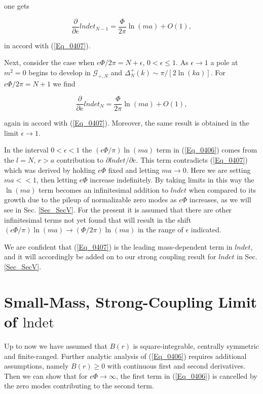 \documentclass[a4paper,twocolumn,showpacs,preprintnumbers,amsmath,amssymb]{revtex4}
\newcommand{\pdo}[1]{\ensuremath{\frac{\partial }
        {\partial #1 }}}
\begin{document}
\noindent
one gets

\begin{equation}
\label{Eq_0410}
\pdo{e} lndet_{N-1} = \frac{\Phi}{2\pi} \ln(ma) + O(1),
\end{equation}

\noindent
in accord with (\ref{Eq_0407}).

Next, consider the case when $e\Phi/2\pi = N + \epsilon$,
$0 < \epsilon \leq 1$. As $\epsilon \to 1$ a pole at $m^2 = 0$ begins
to develop in $\mathcal{G}_{+,N}$ and
$\Delta^{+}_N(k) \sim \pi / [2\ln(ka)]$. For $e\Phi/2\pi = N+1$ we
find

\begin{equation}
\label{Eq_0411}
\pdo{e} lndet_N = \frac{\Phi}{2\pi}\ln(ma) + O(1),
\end{equation}

\noindent
again in accord with (\ref{Eq_0407}). Moreover, the same result is
obtained in the limit $\epsilon \to 1$.

In the interval $0 < \epsilon < 1$ the $(\epsilon\Phi/\pi)\ln(ma)$
term in (\ref{Eq_0406}) comes from the $l=N$, $r > a$ contribution to
$\partial lndet / \partial e$. This term contradicts (\ref{Eq_0407})
which was derived by holding $e\Phi$ fixed and letting $ma \to
0$. Here we are setting $ma << 1$, then letting $e\Phi$ increase
indefinitely. By taking limits in this way the $\ln(ma)$ term becomes
an infinitesimal addition to $lndet$ when compared to its growth due
to the pileup of normalizable zero modes as $e\Phi$ increases, as we
will see in Sec. \ref{Sec_SecV}. For the present it is assumed that
there are other infinitesimal terms not yet found that will result in
the shift $(\epsilon \Phi / \pi)\ln(ma) \to (\Phi/2\pi)\ln(ma)$ in the
range of $\epsilon$ indicated.

We are confident that (\ref{Eq_0407}) is the leading mass-dependent term
in $lndet$, and it will accordingly be added on to our strong coupling
result for $lndet$ in Sec. \ref{Sec_SecV}.



\section{\label{Sec_SecV}
Small-Mass, Strong-Coupling Limit of $\text{lndet}$}


Up to now we have assumed that $B(r)$ is square-integrable,
centrally symmetric and finite-ranged. Further analytic analysis of
(\ref{Eq_0406}) requires additional assumptions, namely $B(r) \ge 0$
with continuous first and second derivatives. Then we can show that
for $e\Phi \to \infty$, the first term in (\ref{Eq_0406}) is cancelled
by the zero modes contributing to the second term.
\end{document}
